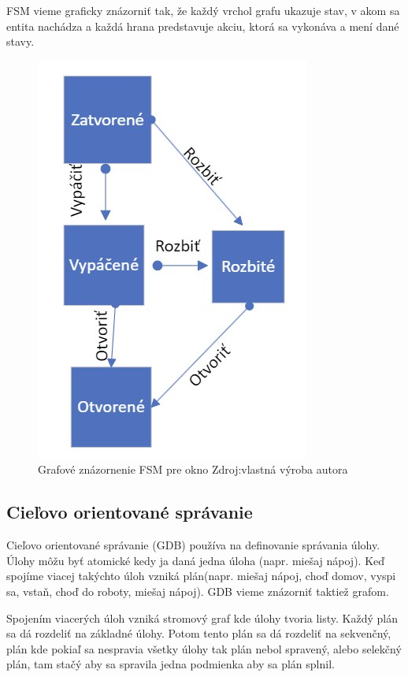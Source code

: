 \documentclass[10pt,oneside,slovak,a4paper]{article}
\begin{document}
FSM vieme graficky znázorniť tak, že každý vrchol grafu ukazuje stav, v akom sa entita nachádza a každá hrana predstavuje akciu, ktorá sa vykonáva a mení dané stavy.~\cite{1.zdroj}
\begin{figure} [h!]
  \includegraphics[scale=0.43]{stv2.jpg}
  \caption{Grafové znázornenie FSM pre okno Zdroj:vlastná výroba autora}
  \label{fig:FSM}
\end{figure}

\newpage
\subsection{Cieľovo orientované správanie} \label{GDB}

Cieľovo orientované správanie (GDB) používa na definovanie správania úlohy. Úlohy môžu byť atomické kedy ja daná jedna úloha (napr. miešaj nápoj). Keď spojíme viacej takýchto úloh vzniká plán(napr. miešaj nápoj, choď domov, vyspi sa, vstaň, choď do roboty, miešaj nápoj). GDB vieme znázorniť taktiež grafom.

Spojením viacerých úloh vzniká stromový graf kde úlohy tvoria listy. Každý plán sa dá rozdeliť na základné úlohy. Potom tento plán sa dá rozdeliť na sekvenčný, plán kde pokiaľ sa nespravia všetky úlohy tak plán nebol spravený, alebo selekčný plán, tam stačý aby sa spravila jedna podmienka aby sa plán splnil. ~\cite{1.zdroj}
\end{document}
